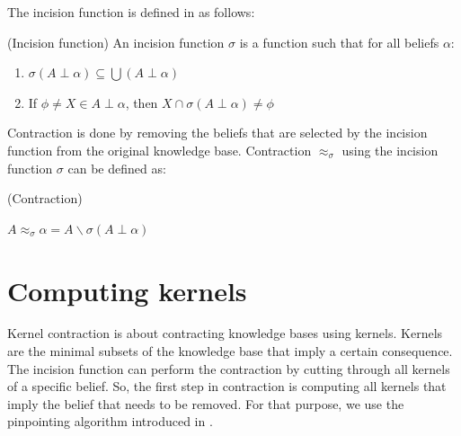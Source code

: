 The incision function is defined in \cite{hansson} as follows:
\begin{defn}(Incision function)
An incision function $\sigma$ is a function such that for all beliefs $\alpha$:
\begin{enumerate}
\item $\sigma (A \perp \alpha) \subseteq \bigcup (A \perp \alpha)$
\item If $\phi \neq X \in A \perp \alpha$, then $X \cap \sigma (A \perp \alpha) \neq \phi$
\end{enumerate}
\end{defn}
Contraction is done by removing the beliefs that are selected by the incision function from the original knowledge base. Contraction $\approx_\sigma$ using the incision function $\sigma$ can be defined as:\cite{hansson}
\begin{defn} (Contraction)
\begin{center}
$A \approx_\sigma \alpha = A \smallsetminus \sigma (A \perp \alpha)$
\end{center}
\end{defn}


\section{Computing kernels}
Kernel contraction is about contracting knowledge bases using kernels. Kernels are the minimal subsets of the knowledge base that imply a certain consequence. The incision function can perform the contraction by cutting through all kernels of a specific belief. So, the first step in contraction is computing all kernels that imply the belief that needs to be removed. For that purpose, we use the pinpointing algorithm introduced in \cite{pin}.

